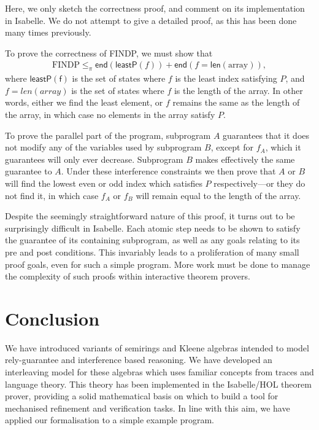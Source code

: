 \documentclass{llncs}
\newcommand{\edn}{\mathsf{end}}
\begin{document}
Here, we only sketch the correctness proof, and comment on its
implementation in Isabelle. We do not attempt to give a detailed
proof, as this has been done many times previously.

To prove the correctness of FINDP, we must show that
\begin{align*}
\text{FINDP} \le_\pi \edn(\mathsf{leastP}(f)) + \edn(f = \mathsf{len}(\text{array})),
\end{align*}
where $\mathsf{leastP(f)}$ is the set of states where $f$ is the least
index satisfying $P$, and $f = len(array)$ is the set of states where
$f$ is the length of the array. In other words, either we find the
least element, or $f$ remains the same as the length of the array, in
which case no elements in the array satisfy $P$.

To prove the parallel part of the program, subprogram $A$ guarantees
that it does not modify any of the variables used by subprogram $B$,
except for $f_A$, which it guarantees will only ever
decrease. Subprogram $B$ makes effectively the same guarantee to
$A$. Under these interference constraints we then prove that $A$ or
$B$ will find the lowest even or odd index which satisfies $P$
respectively---or they do not find it, in which case $f_A$ or $f_B$
will remain equal to the length of the array.

Despite the seemingly straightforward nature of this proof, it turns
out to be surprisingly difficult in Isabelle. Each atomic step
needs to be shown to satisfy the guarantee of its containing
subprogram, as well as any goals relating to its pre and post
conditions. This invariably leads to a proliferation of many small
proof goals, even for such a simple program. More work must be done
to manage the complexity of such proofs within interactive theorem
provers.

\section{Conclusion}

We have introduced variants of semirings and Kleene algebras intended
to model rely-guarantee and interference based reasoning. We have
developed an interleaving model for these algebras which uses familiar
concepts from traces and language theory. This theory has been
implemented in the Isabelle/HOL theorem prover, providing a solid
mathematical basis on which to build a tool for mechanised refinement
and verification tasks. In line with this aim, we have applied
our formalisation to a simple example program.
\end{document}

